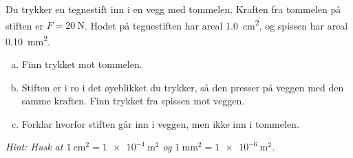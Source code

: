 %
Du trykker en tegnestift inn i en vegg med tommelen. Kraften fra tommelen på stiften er $F = \SI{20}{\newton}$. Hodet på tegnestiften har areal \SI{1.0}{\centi\metre\squared}, og spissen har areal \SI{0.10}{\milli\metre\squared}.
\begin{enumerate}[a)]
    \item Finn trykket mot tommelen.
    \item Stiften er i ro i det øyeblikket du trykker, så den presser på veggen med den samme kraften. Finn trykket fra spissen mot veggen.
    \item Forklar hvorfor stiften går inn i veggen, men ikke inn i tommelen.
\end{enumerate}
\textit{Hint: Husk at $\SI{1}{\centi\metre\squared} = \SI{1e-4}{\metre\squared}$ og $\SI{1}{\milli\metre\squared} = \SI{1e-6}{\metre\squared}$.}
%
